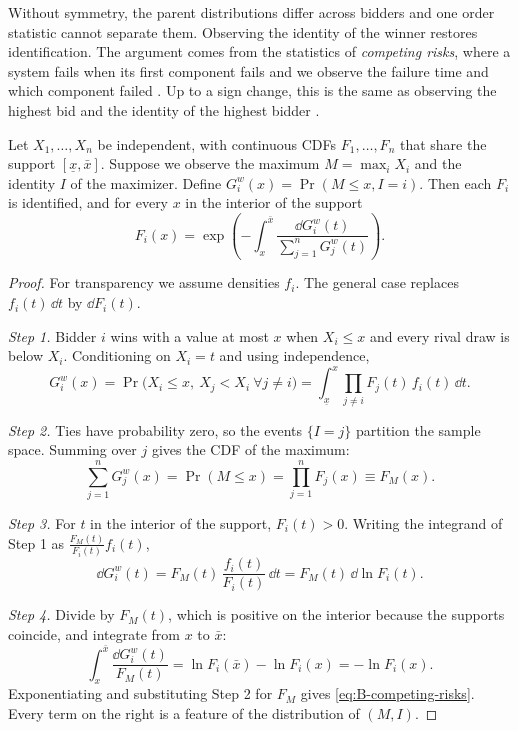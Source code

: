 Without symmetry, the parent distributions differ across bidders and one order statistic cannot separate
them. Observing the identity of the winner restores identification. The argument comes from the
statistics of \emph{competing risks}, where a system fails when its first component fails and we observe the
failure time and which component failed \citep{Berman1963}. Up to a sign change, this is the same as
observing the highest bid and the identity of the highest bidder \citep[fn.~21]{AtheyHaile2002}.

\begin{proposition}\label{prop:B-competing-risks}
Let $X_1, \dots, X_n$ be independent, with continuous CDFs $F_1, \dots, F_n$ that share the support
$[\underline x, \bar x]$. Suppose we observe the maximum $M = \max_i X_i$ and the identity $I$ of the
maximizer. Define $G_i^w(x) = \Pr(M \leq x, I = i)$. Then each $F_i$ is identified, and for every $x$ in the
interior of the support
\begin{equation}\label{eq:B-competing-risks}
  F_i(x) = \exp\left(-\int_x^{\bar x}\frac{\dd G_i^w(t)}{\sum_{j=1}^{n}G_j^w(t)}\right).
\end{equation}
\end{proposition}

\begin{proof}
For transparency we assume densities $f_i$. The general case replaces $f_i(t)\,\dd t$ by $\dd F_i(t)$.

\emph{Step 1.} Bidder $i$ wins with a value at most $x$ when $X_i \leq x$ and every rival draw is below
$X_i$. Conditioning on $X_i = t$ and using independence,
\begin{equation*}
  G_i^w(x) = \Pr\big(X_i \leq x,\ X_j < X_i \ \forall j \neq i\big) = \int_{\underline x}^{x}
  \prod_{j \neq i}F_j(t)\,f_i(t)\,\dd t.
\end{equation*}

\emph{Step 2.} Ties have probability zero, so the events $\{I = j\}$ partition the sample space. Summing over
$j$ gives the CDF of the maximum:
\begin{equation*}
  \sum_{j=1}^{n}G_j^w(x) = \Pr(M \leq x) = \prod_{j=1}^{n}F_j(x) \equiv F_M(x).
\end{equation*}

\emph{Step 3.} For $t$ in the interior of the support, $F_i(t) > 0$. Writing the integrand of Step 1 as
$\frac{F_M(t)}{F_i(t)}f_i(t)$,
\begin{equation*}
  \dd G_i^w(t) = F_M(t)\,\frac{f_i(t)}{F_i(t)}\,\dd t = F_M(t)\,\dd\ln F_i(t).
\end{equation*}

\emph{Step 4.} Divide by $F_M(t)$, which is positive on the interior because the supports coincide, and
integrate from $x$ to $\bar x$:
\begin{equation*}
  \int_x^{\bar x}\frac{\dd G_i^w(t)}{F_M(t)} = \ln F_i(\bar x) - \ln F_i(x) = -\ln F_i(x).
\end{equation*}
Exponentiating and substituting Step 2 for $F_M$ gives \eqref{eq:B-competing-risks}. Every term on the right
is a feature of the distribution of $(M, I)$.
\end{proof}

